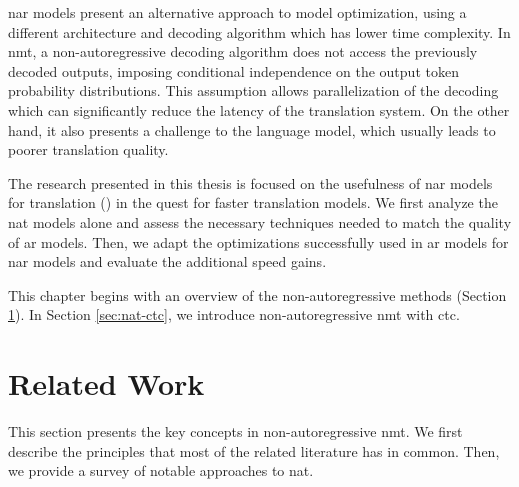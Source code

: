 \Gls{nar} models present an alternative approach to model optimization, using a
different architecture and decoding algorithm which has lower time complexity.
In \gls{nmt}, a non-autoregressive decoding algorithm does not access the
previously decoded outputs, imposing conditional independence on the output
token probability distributions. This assumption allows parallelization of the
decoding which can significantly reduce the latency of the translation
system. On the other hand, it also presents a challenge to the language model,
which usually leads to poorer translation quality.

The research presented in this thesis is focused on the usefulness of \gls{nar}
models for translation () in the quest for
faster translation models. We first analyze the \gls{nat} models alone and
assess the necessary techniques needed to match the quality of \gls{ar} models.
Then, we adapt the optimizations successfully used in \gls{ar} models for
\gls{nar} models and evaluate the additional speed gains.

This chapter begins with an overview of the non-autoregressive methods (Section
\ref{sec:nat-methods}). In Section \ref{sec:nat-ctc}, we introduce
non-autoregressive \gls{nmt} with \gls{ctc}. 


\section{Related Work}
\label{sec:nat-methods}

This section presents the key concepts in non-autoregressive \gls{nmt}. We
first describe the principles that most of the related literature has in
common. Then, we provide a survey of notable approaches to \gls{nat}.

